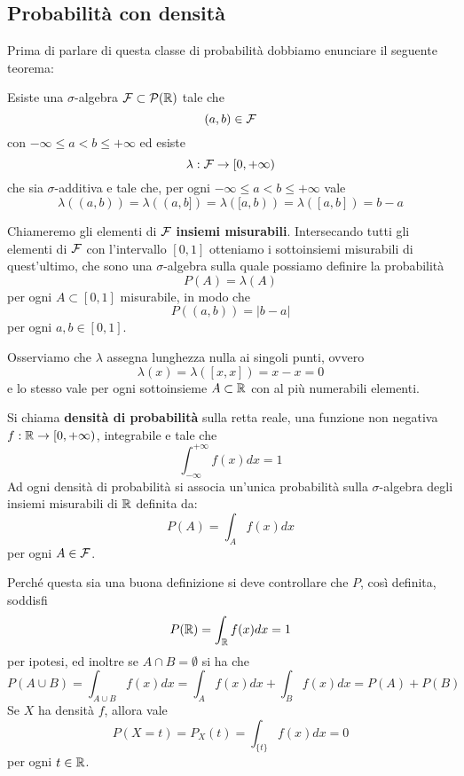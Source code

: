 \subsection{Probabilità con densità}
Prima di parlare di questa classe di probabilità dobbiamo enunciare il seguente teorema:
\begin{theorem}
	Esiste una $\sigma$-algebra $\mathcal{F} \subset \mathcal{P}(\mathbb{R})$ tale che
	\[ (a, b) \in \mathcal{F} \]
	con $-\infty \leq a < b \leq +\infty$ ed esiste
	\[ \lambda : \mathcal{F} \to [0, +\infty) \]
			che sia $\sigma$-additiva e tale che, per ogni $-\infty \leq a < b \leq +\infty$ vale
			\[ \lambda((a,b)) = \lambda((a,b]) = \lambda ([a,b)) = \lambda([a,b]) = b - a \]
\end{theorem}

Chiameremo gli elementi di $\mathcal{F}$ \textbf{insiemi misurabili}. Intersecando tutti gli elementi di
$\mathcal{F}$ con l'intervallo $[0,1]$ otteniamo i sottoinsiemi misurabili di quest'ultimo, che sono una
$\sigma$-algebra sulla quale possiamo definire la probabilità
\[ P (A) = \lambda (A) \]
per ogni $A \subset [0,1]$ misurabile, in modo che
\[ P((a, b)) = |b - a| \]
per ogni $a,b \in [0,1]$.

\begin{observation}
	Osserviamo che $\lambda$ assegna lunghezza nulla ai singoli punti, ovvero
	\[ \lambda(x) = \lambda([x,x]) = x - x = 0 \]
	e lo stesso vale per ogni sottoinsieme $A \subset \mathbb{R}$ con al più numerabili elementi.
\end{observation}

\begin{definition}
	Si chiama \textbf{densità di probabilità} sulla retta reale, una funzione non negativa
	$f : \mathbb{R} \to [0, +\infty)$, integrabile e tale che
	\[ \int_{-\infty}^{+\infty} f(x) dx = 1 \]
	Ad ogni densità di probabilità si associa un'unica probabilità sulla $\sigma$-algebra degli
	insiemi misurabili di $\mathbb{R}$ definita da:
	\[ P(A) = \int_A f(x) dx \]
	per ogni $A \in \mathcal{F}$.
\end{definition}

Perché questa sia una buona definizione si deve controllare che $P$, così definita, soddisfi
\[ P(\mathbb{R}) = \int_{\mathbb{R}} f(x) dx = 1 \]
per ipotesi, ed inoltre se $A \cap B = \emptyset$ si ha che
\[ P(A \cup B) = \int_{A \cup B} f(x) dx = \int_A f(x) dx + \int_B f(x) dx = P(A) + P(B) \]
Se $X$ ha densità $f$, allora vale
\[ P(X = t) = P_X (t) = \int_{\{t\}} f(x) dx = 0 \]
per ogni $t \in \mathbb{R}$.